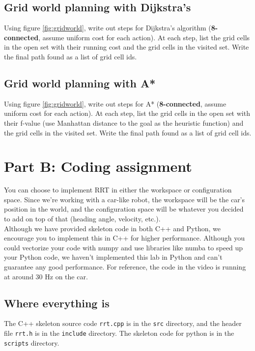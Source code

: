 \documentclass[letta4 paper]{article}
\numberwithin{equation}{section}
\newcommand{\0}{\mathbf{0}}
\begin{document}
	\subsection{Grid world planning with Dijkstra's}
	Using figure \ref{fig:gridworld}, write out steps for Dijkstra's algorithm (\textbf{8-connected}, assume uniform cost for each action). At each step, list the grid cells in the open set with their running cost and the grid cells in the visited set. Write the final path found as a list of grid cell ids.
	\subsection{Grid world planning with A*}
	Using figure \ref{fig:gridworld}, write out steps for A* (\textbf{8-connected}, assume uniform cost for each action). At each step, list the grid cells in the open set with their f-value (use Manhattan distance to the goal as the heuristic function) and the grid cells in the visited set. Write the final path found as a list of grid cell ids.\\
	
	\newpage
	\section{Part B: Coding assignment}
	You can choose to implement RRT in either the workspace or configuration space. Since we're working with a car-like robot, the workspace will be the car's position in the world, and the configuration space will be whatever you decided to add on top of that (heading angle, velocity, etc.).\\
	Although we have provided skeleton code in both C++ and Python, we encourage you to implement this in C++ for higher performance. Although you could vectorize your code with numpy and use libraries like numba to speed up your Python code, we haven't implemented this lab in Python and can't guarantee any good performance. For reference, the code in the video is running at around 30 Hz on the car.
	
	\subsection{Where everything is}
	The C++ skeleton source code \texttt{rrt.cpp} is in the \texttt{src} directory, and the header file \texttt{rrt.h} is in the \texttt{include} directory. The skeleton code for python is in the \texttt{scripts} directory.
\end{document}

